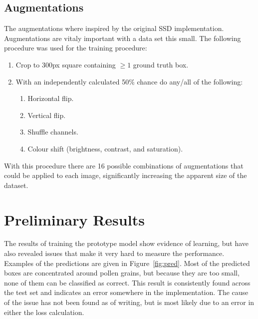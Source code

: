 \subsection*{Augmentations}
The augmentations where inspired by the original SSD implementation.
Augmentations are vitaly important with a data set this small.
The following procedure was used for the training procedure:
\begin{enumerate}
  \item Crop to 300px square containing \( \geq 1 \) ground truth box.
  \item With an independently calculated 50\% chance do any/all of the following:
  \begin{enumerate}
  \item Horizontal flip.
  \item Vertical flip.
  \item Shuffle channels.
  \item Colour shift (brightness, contrast, and saturation).
  \end{enumerate}
\end{enumerate}

With this procedure there are 16 possible combinations of augmentations that could be applied to each image, significantly increasing the apparent size of the dataset.

\section*{Preliminary Results}
The results of training the prototype model show evidence of learning, but have also revealed issues that make it very hard to measure the performance.
Examples of the predictions are given in Figure~\ref{fig:pred}.
Most of the predicted boxes are concentrated around pollen grains, but because they are too small, none of them can be classified as correct.
This result is consistently found across the test set and indicates an error somewhere in the implementation.
The cause of the issue has not been found as of writing, but is most likely due to an error in either the loss calculation.


